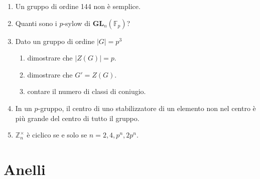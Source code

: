 \documentclass[a4paper]{article}
\theoremstyle{remark}
\theoremstyle{definition}
\newcommand{\Z}{\mathbb{Z}}
\begin{document}
\begin{multicols}{2}
\begin{enumerate}
		\item Un gruppo di ordine 144 non è semplice.
		
		\item Quanti sono i $ p $-sylow di $ \textbf{GL}_n(\mathbb{F}_p) $?
		
		\item Dato un gruppo di ordine $ |G|= p^3 $
		\begin{enumerate}
			\item dimostrare che $ |Z(G)| = p $.
			\item dimostrare che $ G' = Z(G) $.
			\item contare il numero di classi di coniugio.
		\end{enumerate}
		
		\item In un $ p $-gruppo, il centro di uno stabilizzatore di un elemento non nel centro è più grande del centro di tutto il gruppo.
		
		\item $ \Z_n^\times $ è ciclico se e solo se $ n = 2, 4, p^n, 2p^n $.
	
	\end{enumerate}
	
	
\end{multicols}
\newpage
\setcounter{section}{0} %
\section{Anelli}
\end{document}
